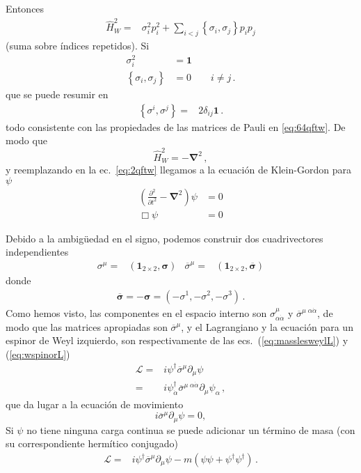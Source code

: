 \begin{frame}
Entonces
\begin{align}
  \hat{H}^2_W=& \sigma_i^2p_i^2+\sum_{i\lt j}\left\{ \sigma_i, \sigma_j\right\}p_i p_j
\end{align}
(suma sobre índices repetidos). Si
\begin{align}
  \label{eq:107qft}
   \sigma_i^2&=\boldsymbol{1}\nonumber\\
  \left\{ \sigma_i, \sigma_j\right\}&=0\qquad i\ne j\,.
\end{align}
que se puede resumir en
\begin{align}
  \left\{ \sigma^i,\sigma^j \right\}=&2\delta_{ij} \boldsymbol{1}\,.
\end{align}
todo consistente con las propiedades de las matrices de Pauli en  \eqref{eq:64qftw}. 
De modo que
\begin{equation}
  \hat{H}^2_W=-\boldsymbol{\nabla}^2\,,
\end{equation}
y reemplazando en la ec.~\eqref{eq:2qftw} llegamos a la ecuación de Klein-Gordon para $\psi$
\begin{align}
   \left(\frac{\partial^2}{\partial t^2}-\boldsymbol{\nabla}^2\right)\psi&=0\nonumber\\
   \Box\psi&=0
\end{align}
\end{frame}
Debido a la ambigüedad  en el signo, podemos construir dos cuadrivectores independientes
   \begin{align}
 \sigma^{\mu}=& \left( \boldsymbol{1}_{2\times2},\boldsymbol{\sigma} \right)&
 \overline{\sigma}^{\mu}=& \left( \boldsymbol{1}_{2\times2},\overline{\boldsymbol{\sigma}} \right)
\end{align}
donde
\begin{align}
  \overline{\boldsymbol{\sigma}}=-\boldsymbol{\sigma}=\left(-\sigma^1,-\sigma^2,-\sigma^3\right)\,.
\end{align}
Como hemos visto, las componentes en el espacio interno son
$\sigma^{\mu}_{\alpha\dot{\alpha}}$ y $\overline{\sigma}^{\mu\;\alpha\dot{\alpha}}$, de modo que  las matrices apropiadas son $\overline{\sigma}^\mu$, y el Lagrangiano  y la ecuación para un espinor de Weyl izquierdo, son respectivamente de las ecs.~(\ref{eq:masslesweylL}) y (\ref{eq:wspinorL})
\begin{align}
  \label{eq:115qft}
  \mathcal{L}=&i\psi^\dagger\overline{\sigma}^\mu\partial_\mu\psi \nonumber\\
      =&i\psi^\dagger_{\dot{\alpha}}\overline{\sigma}^{\mu\; \alpha\dot{\alpha}}\partial_\mu\psi_{\alpha}\,,
\end{align}
que da lugar a la ecuación de movimiento
\begin{equation}
  \label{eq:116qft}
  i\overline{\sigma}^\mu\partial_\mu\psi=0,
\end{equation}
Si $\psi$ no tiene ninguna carga continua se puede adicionar un término de masa (con su correspondiente hermítico conjugado)
\begin{align}
  \mathcal{L}=& i\psi^\dagger\overline{\sigma}^\mu\partial_\mu\psi -m \left( \psi\psi+\psi^{\dagger}\psi^{\dagger} \right)\,.
\end{align}


